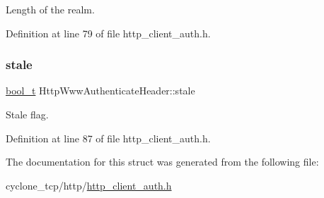 Length of the realm. 



Definition at line 79 of file http\+\_\+client\+\_\+auth.\+h.

\mbox{\label{structHttpWwwAuthenticateHeader_aa2703d9b83c9c45022f3eb3476d07ffd}} 
\subsubsection{\texorpdfstring{stale}{stale}}
{\footnotesize\ttfamily \hyperlink{compiler__port_8h_a812d16e5494522586b3784e55d479912}{bool\+\_\+t} Http\+Www\+Authenticate\+Header\+::stale}



Stale flag. 



Definition at line 87 of file http\+\_\+client\+\_\+auth.\+h.



The documentation for this struct was generated from the following file\+:\begin{DoxyCompactItemize}
\item 
cyclone\+\_\+tcp/http/\hyperlink{http__client__auth_8h}{http\+\_\+client\+\_\+auth.\+h}\end{DoxyCompactItemize}
